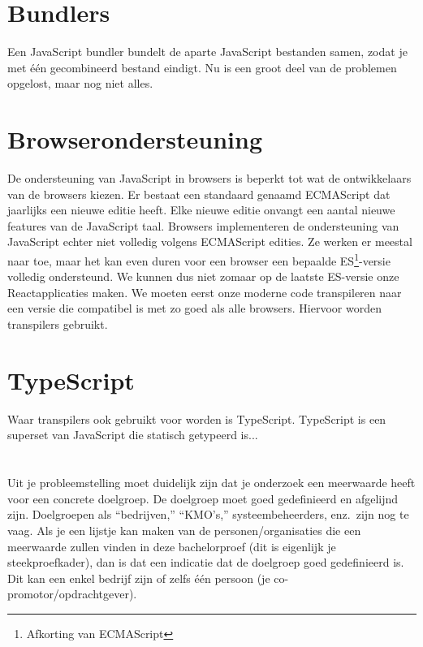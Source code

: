 \section{Bundlers}

Een JavaScript bundler bundelt de aparte JavaScript bestanden samen, zodat je met één gecombineerd bestand eindigt. Nu is een groot deel van de problemen opgelost, maar nog niet alles.

\section{Browserondersteuning}

De ondersteuning van JavaScript in browsers is beperkt tot wat de ontwikkelaars van de browsers kiezen. Er bestaat een standaard genaamd ECMAScript dat jaarlijks een nieuwe editie heeft. Elke nieuwe editie onvangt een aantal nieuwe features van de JavaScript taal. Browsers implementeren de ondersteuning van JavaScript echter niet volledig volgens ECMAScript edities. Ze werken er meestal naar toe, maar het kan even duren voor een browser een bepaalde ES\footnote{Afkorting van ECMAScript}-versie volledig ondersteund. We kunnen dus niet zomaar op de laatste ES-versie onze Reactapplicaties maken. We moeten eerst onze moderne code transpileren naar een versie die compatibel is met zo goed als alle browsers. Hiervoor worden transpilers gebruikt.

\section{TypeScript}

Waar transpilers ook gebruikt voor worden is TypeScript. TypeScript is een superset van JavaScript die statisch getypeerd is... 


\section{}
\label{sec:probleemstelling}

Uit je probleemstelling moet duidelijk zijn dat je onderzoek een meerwaarde heeft voor een concrete doelgroep. De doelgroep moet goed gedefinieerd en afgelijnd zijn. Doelgroepen als ``bedrijven,'' ``KMO's,'' systeembeheerders, enz.~zijn nog te vaag. Als je een lijstje kan maken van de personen/organisaties die een meerwaarde zullen vinden in deze bachelorproef (dit is eigenlijk je steekproefkader), dan is dat een indicatie dat de doelgroep goed gedefinieerd is. Dit kan een enkel bedrijf zijn of zelfs één persoon (je co-promotor/opdrachtgever).

